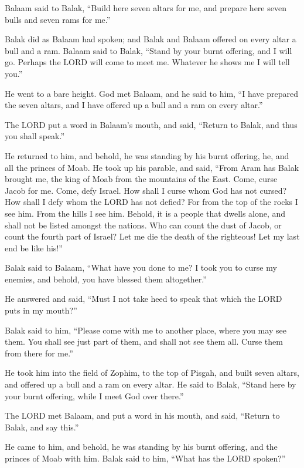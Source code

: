  Balaam said to Balak, ``Build here seven altars for me, and
prepare here seven bulls and seven rams for me.''

 Balak did as Balaam had spoken; and Balak and Balaam
offered on every altar a bull and a ram.  Balaam said to
Balak, ``Stand by your burnt offering, and I will go. Perhaps the LORD
will come to meet me. Whatever he shows me I will tell you.''

He went to a bare height.  God met Balaam, and he said to
him, ``I have prepared the seven altars, and I have offered up a bull
and a ram on every altar.''

 The LORD put a word in Balaam's mouth, and said, ``Return
to Balak, and thus you shall speak.''

 He returned to him, and behold, he was standing by his
burnt offering, he, and all the princes of Moab.  He took up
his parable, and said, ``From Aram has Balak brought me, the king of
Moab from the mountains of the East. Come, curse Jacob for me. Come,
defy Israel.  How shall I curse whom God has not cursed? How
shall I defy whom the LORD has not defied?  For from the top
of the rocks I see him. From the hills I see him. Behold, it is a people
that dwells alone, and shall not be listed amongst the nations.
 Who can count the dust of Jacob, or count the fourth part
of Israel? Let me die the death of the righteous! Let my last end be
like his!''

 Balak said to Balaam, ``What have you done to me? I took
you to curse my enemies, and behold, you have blessed them altogether.''

 He answered and said, ``Must I not take heed to speak that
which the LORD puts in my mouth?''

 Balak said to him, ``Please come with me to another place,
where you may see them. You shall see just part of them, and shall not
see them all. Curse them from there for me.''

 He took him into the field of Zophim, to the top of
Pisgah, and built seven altars, and offered up a bull and a ram on every
altar.  He said to Balak, ``Stand here by your burnt
offering, while I meet God over there.''

 The LORD met Balaam, and put a word in his mouth, and
said, ``Return to Balak, and say this.''

 He came to him, and behold, he was standing by his burnt
offering, and the princes of Moab with him. Balak said to him, ``What
has the LORD spoken?''

